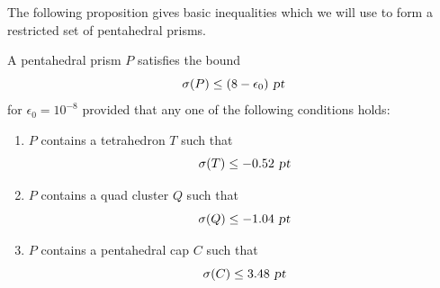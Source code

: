 
The following proposition gives basic inequalities which we will use to form a restricted set of
pentahedral prisms.


\begin{prop}
\label{prop:pentscorebd}
A pentahedral prism $P$ satisfies the bound
\[\operatorname{\sigma}(P) \le (8 - \epsilon_0) \text{ \sl pt}\]
for $\epsilon_0 = 10^{-8}$ provided that any one of the following conditions holds:
\begin{enumerate}
\item $P$ contains a tetrahedron $T$ such that
    \[\operatorname{\sigma}(T) \le -0.52 \text{ \sl pt}\] \label{eq:triangle}
\item $P$ contains a quad cluster $Q$ such that
    \[\operatorname{\sigma}(Q) \le -1.04 \text{ \sl pt}\] \label{eq:quad}
\item $P$ contains a pentahedral cap $C$ such that
    \[\operatorname{\sigma}(C) \le 3.48 \text{ \sl pt}\]  \label{eq:penta}
\end{enumerate}
\end{prop}


